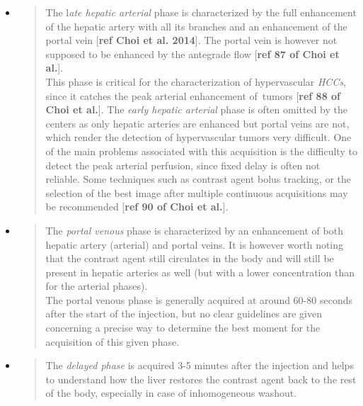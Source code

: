 \documentclass[]{article}
\begin{document}
\begin{itemize}
  \begin{itemize}
  \item
    \begin{quote}
    The l\emph{ate hepatic arterial} phase is characterized by the full
    enhancement of the hepatic artery with all its branches and an
    enhancement of the portal vein {[}\textbf{ref Choi et al. 2014}{]}.
    The portal vein is however not supposed to be enhanced by the
    antegrade flow {[}\textbf{ref 87 of Choi et al.}{]}.\\
    This phase is critical for the characterization of hypervascular
    \emph{HCCs}, since it catches the peak arterial enhancement
    of~tumors {[}\textbf{ref 88 of Choi et al.}{]}. The \emph{early
    hepatic arterial} phase is often omitted by the centers as only
    hepatic arteries are enhanced but portal veins are not, which render
    the detection of hypervascular tumors very difficult. One of the
    main problems associated with this acquisition is the difficulty to
    detect the peak arterial perfusion, since fixed delay is often not
    reliable. Some techniques such as contrast agent bolus tracking, or
    the selection of the best image after multiple continuous
    acquisitions may be recommended {[}\textbf{ref 90 of Choi et
    al.}{]}.
    \end{quote}
  \item
    \begin{quote}
    The \emph{portal venous} phase is characterized by an enhancement of
    both hepatic artery (arterial) and portal veins. It is however worth
    noting that the contrast agent still circulates in the body and will
    still be present in hepatic arteries as well (but with a lower
    concentration than for the arterial phases).\\
    The portal venous phase is generally acquired at around 60-80
    seconds after the start of the injection, but no clear guidelines
    are given concerning a precise way to determine the best moment for
    the acquisition of this given phase.
    \end{quote}
  \item
    \begin{quote}
    The \emph{delayed phase} is acquired 3-5 minutes after the injection
    and helps to understand how the liver restores the contrast agent
    back to the rest of the body, especially in case of inhomogeneous
    washout.
    \end{quote}
  \end{itemize}
\end{itemize}
\end{document}
